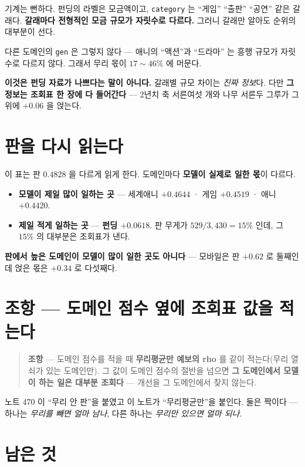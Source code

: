 \documentclass[11pt]{article}
\begin{document}
기계는 뻔하다. 펀딩의 라벨은 모금액이고, \texttt{category} 는 ``게임''
``출판'' ``공연'' 같은 갈래다. \textbf{갈래마다 전형적인 모금 규모가
자릿수로 다르다.} 그러니 갈래만 알아도 순위의 대부분이 선다.

다른 도메인의 \texttt{gen} 은 그렇지 않다 --- 애니의 ``액션''과 ``드라마''
는 흥행 규모가 자릿수로 다르지 않다. 그래서 무리 몫이 $17 \sim 46\%$ 에
머문다.

\textbf{이것은 펀딩 자료가 나쁘다는 말이 아니다.} 갈래별 규모 차이는
\emph{진짜 정보}다. 다만 \textbf{그 정보는 조회표 한 장에 다 들어간다} ---
2년치 축 서른여섯 개와 나무 서른두 그루가 그 위에 $+0.06$ 을 얹는다.

\section{판을 다시 읽는다}

이 표는 판 $0.4828$ 을 다르게 읽게 한다. 도메인마다 \textbf{모델이 실제로
일한 몫}이 다르다.

\begin{itemize}
\item \textbf{모델이 제일 많이 일하는 곳} --- 세계애니 $+0.4644$ ·
게임 $+0.4519$ · 애니 $+0.4420$.
\item \textbf{제일 적게 일하는 곳} --- \textbf{펀딩 $+0.0618$}. 판
무게가 $529/3{,}430 = 15\%$ 인데, 그 $15\%$ 의 대부분은 조회표가 낸다.
\end{itemize}

\textbf{판에서 높은 도메인이 모델이 많이 일한 곳도 아니다} --- 모바일은
판 $+0.62$ 로 둘째인데 얹은 몫은 $+0.34$ 로 다섯째다.

\section*{조항 --- 도메인 점수 옆에 조회표 값을 적는다}

\begin{quote}
\textbf{조항} --- 도메인 점수를 적을 때 \textbf{무리평균만 예보의 rho} 를
같이 적는다(무리 열쇠가 있는 도메인만). 그 값이 도메인 점수의 절반을
넘으면 \textbf{그 도메인에서 모델이 하는 일은 대부분 조회다} --- 개선을
그 도메인에서 찾지 않는다.
\end{quote}

노트 470 이 ``무리 안 판''을 붙였고 이 노트가 ``무리평균만''을 붙인다.
둘은 짝이다 --- 하나는 \emph{무리를 빼면 얼마 남나}, 다른 하나는
\emph{무리만 있으면 얼마 되나}.

\section*{남은 것}
\end{document}
